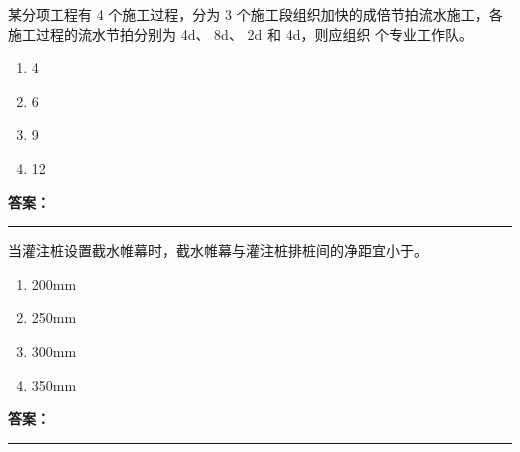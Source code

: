 \documentclass[UTF8,fontset=fandol,11pt]{ctexart}
\newcommand{\answerline}{\textcolor{answerred}{\rule{2.4cm}{0.7pt}}}
\begin{document}
\begin{quizbox}[title={乱序第 81 题｜第十章流水施工原理}]

某分项工程有 4 个施工过程，分为 3 个施工段组织加快的成倍节拍流水施工，各施工过程的流水节拍分别为 4d、 8d、 2d 和 4d，则应组织 个专业工作队。\\

\begin{enumerate}[label=\Alph*.]

\item 4

\item 6

\item 9

\item 12

\end{enumerate}

\textbf{\textcolor{answerred}{答案：}} \answerline

\end{quizbox}

\vspace{0.2em}

\begin{quizbox}[title={乱序第 82 题｜第三章基坑工程}]

当灌注桩设置截水帷幕时，截水帷幕与灌注桩排桩间的净距宜小于。\\

\begin{enumerate}[label=\Alph*.]

\item 200mm

\item 250mm

\item 300mm

\item 350mm

\end{enumerate}

\textbf{\textcolor{answerred}{答案：}} \answerline

\end{quizbox}

\vspace{0.2em}
\end{document}
